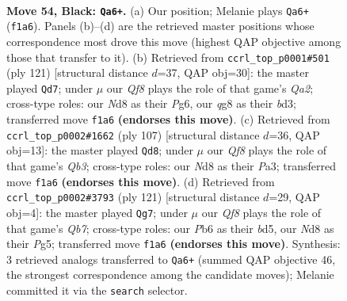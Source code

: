 \documentclass[11pt]{article}
\begin{document}
\clearpage

\begin{figure}[p]\centering
\begin{subfigure}{0.46\textwidth}\centering
\resizebox{\linewidth}{!}{%
\newchessgame
\chessboard[
  setfen={2kn2Q1/p1p3p1/1p4p1/2p5/8/2P5/KP6/5q2 b - - 9 54},
  showmover=false,
  pgfstyle=straightmove, color=movearrow, markmove={f1-a6}
]}
\caption{}
\end{subfigure}\hfill
\begin{subfigure}{0.46\textwidth}\centering
\resizebox{\linewidth}{!}{%
\newchessgame
\chessboard[
  setfen={5Q2/q4p1k/4p1p1/4P2p/8/1p1B1KP1/7P/8 b - - 7 61},
  showmover=false,
  pgfstyle=straightmove, color=movearrow, markmove={a7-d7}
]}
\caption{}
\end{subfigure}
\\[4pt]
\begin{subfigure}{0.46\textwidth}\centering
\resizebox{\linewidth}{!}{%
\newchessgame
\chessboard[
  setfen={8/7P/1q3p2/3pk3/2p1p3/p1P3P1/8/2Q4K b - - 0 54},
  showmover=false,
  pgfstyle=straightmove, color=movearrow, markmove={b6-d8}
]}
\caption{}
\end{subfigure}\hfill
\begin{subfigure}{0.46\textwidth}\centering
\resizebox{\linewidth}{!}{%
\newchessgame
\chessboard[
  setfen={5Q2/8/3K2pk/2pB2p1/2P4p/p6P/1q6/8 b - - 5 61},
  showmover=false,
  pgfstyle=straightmove, color=movearrow, markmove={b2-g7}
]}
\caption{}
\end{subfigure}
\caption{\textbf{Move 54, Black: \texttt{Qa6+}.} (a) Our position; Melanie plays \texttt{Qa6+} (\texttt{f1a6}). Panels (b)--(d) are the retrieved master positions whose correspondence most drove this move (highest QAP objective among those that transfer to it). (b) Retrieved from \texttt{ccrl\_top\_p0001\#501} (ply 121) [structural distance $d$=37, QAP obj=30]: the master played \texttt{Qd7}; under $\mu$ our \emph{Qf8} plays the role of that game's \emph{Qa2}; cross-type roles: our \emph{N}d8 as their \emph{P}g6, our \emph{q}g8 as their \emph{b}d3; transferred move \texttt{f1a6} \textbf{(endorses this move)}. (c) Retrieved from \texttt{ccrl\_top\_p0002\#1662} (ply 107) [structural distance $d$=36, QAP obj=13]: the master played \texttt{Qd8}; under $\mu$ our \emph{Qf8} plays the role of that game's \emph{Qb3}; cross-type roles: our \emph{N}d8 as their \emph{P}a3; transferred move \texttt{f1a6} \textbf{(endorses this move)}. (d) Retrieved from \texttt{ccrl\_top\_p0002\#3793} (ply 121) [structural distance $d$=29, QAP obj=4]: the master played \texttt{Qg7}; under $\mu$ our \emph{Qf8} plays the role of that game's \emph{Qb7}; cross-type roles: our \emph{P}b6 as their \emph{b}d5, our \emph{N}d8 as their \emph{P}g5; transferred move \texttt{f1a6} \textbf{(endorses this move)}. Synthesis: 3 retrieved analogs transferred to \texttt{Qa6+} (summed QAP objective 46, the strongest correspondence among the candidate moves); Melanie committed it via the \texttt{search} selector.}
\label{fig:thought-m107}
\end{figure}
\end{document}
